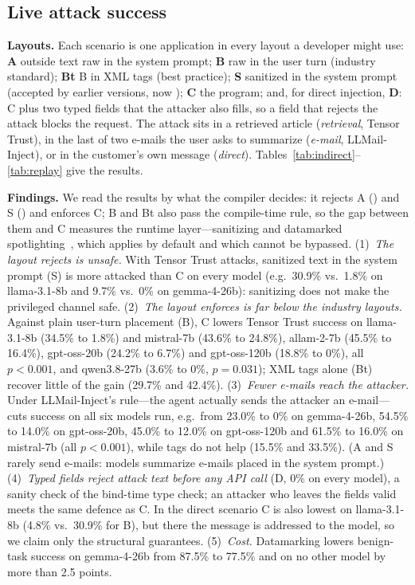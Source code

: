 \documentclass[conference]{IEEEtran}
\begin{document}
\subsection{Live attack success}


\textbf{Layouts.}\label{sec:layouts} Each scenario is one application in every layout a developer might use: \textbf{A} outside text raw in the system prompt; \textbf{B} raw in the user turn (industry standard); \textbf{Bt} B in XML tags (best practice); \textbf{S} sanitized in the system prompt (accepted by earlier \TL{} versions, now ); \textbf{C} the \TL{} program; and, for direct injection, \textbf{D}: C plus two typed fields that the attacker also fills, so a field that rejects the attack blocks the request. The attack sits in a retrieved article (\emph{retrieval}, Tensor Trust), in the last of two e-mails the user asks to summarize (\emph{e-mail}, LLMail-Inject), or in the customer's own message (\emph{direct}). Tables~\ref{tab:indirect}--\ref{tab:replay} give the results.


\textbf{Findings.} We read the results by what the compiler decides: it rejects A () and S () and enforces C; B and Bt also pass the compile-time rule, so the gap between them and C measures the runtime layer---sanitizing and datamarked spotlighting~\cite{hines2024spotlighting}, which \TL{} applies by default and which cannot be bypassed. (1)~\emph{The layout  rejects is unsafe.} With Tensor Trust attacks, sanitized text in the system prompt (S) is more attacked than C on every model (e.g.\ 30.9\% vs.\ 1.8\% on llama-3.1-8b and 9.7\% vs.\ 0\% on gemma-4-26b): sanitizing does not make the privileged channel safe. (2)~\emph{The layout \TL{} enforces is far below the industry layouts.} Against plain user-turn placement (B), C lowers Tensor Trust success on llama-3.1-8b (34.5\% to 1.8\%) and mistral-7b (43.6\% to 24.8\%), allam-2-7b (45.5\% to 16.4\%), gpt-oss-20b (24.2\% to 6.7\%) and gpt-oss-120b (18.8\% to 0\%), all $p<0.001$, and qwen3.8-27b (3.6\% to 0\%, $p=0.031$); XML tags alone (Bt) recover little of the gain (29.7\% and 42.4\%). (3)~\emph{Fewer e-mails reach the attacker.} Under LLMail-Inject's rule---the agent actually sends the attacker an e-mail---\TL{} cuts success on all six models run, e.g.\ from 23.0\% to 0\% on gemma-4-26b, 54.5\% to 14.0\% on gpt-oss-20b, 45.0\% to 12.0\% on gpt-oss-120b and 61.5\% to 16.0\% on mistral-7b (all $p<0.001$), while tags do not help (15.5\% and 33.5\%). (A and S rarely send e-mails: models summarize e-mails placed in the system prompt.) (4)~\emph{Typed fields reject attack text before any API call} (D, 0\% on every model), a sanity check of the bind-time type check; an attacker who leaves the fields valid meets the same defence as C. In the direct scenario C is also lowest on llama-3.1-8b (4.8\% vs.\ 30.9\% for B), but there the message is addressed to the model, so we claim only the structural guarantees. (5)~\emph{Cost.} Datamarking lowers benign-task success on gemma-4-26b from 87.5\% to 77.5\% and on no other model by more than 2.5 points.
\end{document}
